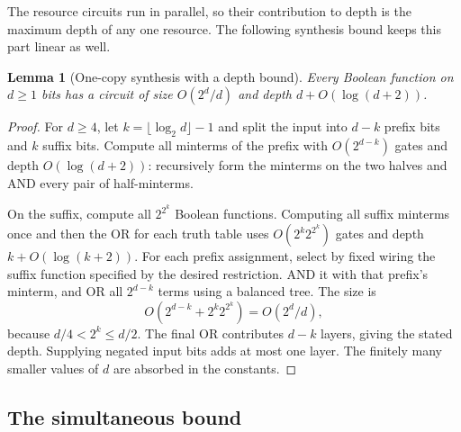 \documentclass[11pt]{article}
\newtheorem{lemma}[lemma]{Lemma}
\begin{document}
The resource circuits run in parallel, so their contribution to depth is
the maximum depth of any one resource.  The following synthesis bound
keeps this part linear as well.

\begin{lemma}[One-copy synthesis with a depth bound]\label{lem:size-depth-synthesis}
Every Boolean function on $d\ge1$ bits has a circuit of size $O(2^d/d)$
and depth $d+O(\log(d+2))$.
\end{lemma}

\begin{proof}
For $d\ge4$, let $k=\lfloor\log_2d\rfloor-1$ and split the input into
$d-k$ prefix bits and $k$ suffix bits.  Compute all minterms of the prefix
with $O(2^{d-k})$ gates and depth $O(\log(d+2))$: recursively form the
minterms on the two halves and AND every pair of half-minterms.

On the suffix, compute all $2^{2^k}$ Boolean functions.  Computing all
suffix minterms once and then the OR for each truth table uses
$O(2^k2^{2^k})$ gates and depth $k+O(\log(k+2))$.
For each prefix assignment, select by fixed wiring the suffix function
specified by the desired restriction.  AND it with that prefix's
minterm, and OR all $2^{d-k}$ terms using a balanced tree.
The size is
\[
  O(2^{d-k}+2^k2^{2^k})=O(2^d/d),
\]
because $d/4<2^k\le d/2$.  The final OR contributes $d-k$ layers, giving
the stated depth.  Supplying negated input bits adds at most one layer.
The finitely many smaller values of $d$ are absorbed in the constants.
\end{proof}

\subsection{The simultaneous bound}
\end{document}
